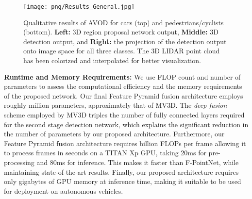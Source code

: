 \documentclass[letterpaper, 10 pt, conference]{ieeeconf}
\begin{document}
\begin{figure*}[t] 
\begin{center}
\texttt{[image: png/Results\_General.jpg]}
\end{center}
\caption{Qualitative results of AVOD for cars (top) and pedestrians/cyclists (bottom). \textbf{Left:} 3D region proposal network output, \textbf{Middle:} 3D detection output, and \textbf{Right:} the projection of the detection output onto image space for all three classes. The 3D LIDAR point cloud has been colorized and interpolated for better visualization. \\}
\label{res_qual}
\end{figure*}

\noindent\textbf{Runtime and Memory Requirements:} We use FLOP count and number of parameters to assess the computational efficiency and the memory requirements of the proposed network. Our final Feature Pyramid fusion architecture employs roughly  million parameters, approximately  that of MV3D. The \textit{deep fusion} scheme employed by MV3D triples the number of fully connected layers required for the second stage detection network, which explains the significant reduction in the number of parameters by our proposed architecture. Furthermore, our Feature Pyramid fusion architecture requires  billion FLOPs per frame allowing it to process frames in  seconds on a TITAN Xp GPU, taking 20ms for pre-processing and 80ms for inference. This makes it  faster than F-PointNet, while maintaining state-of-the-art results. Finally, our proposed architecture requires only  gigabytes of GPU memory at inference time, making it suitable to be used for deployment on autonomous vehicles.
\end{document}

